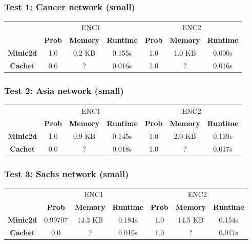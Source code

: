 \subsubsection{Test 1: Cancer network (small)}
\begin{table}[H]
    \centering
    \begin{tabular}{c|c|c|c|c|c|c|}
    \cline{2-7}
            & \multicolumn{3}{c|}{ENC1} & \multicolumn{3}{c|}{ENC2} \\ \cline{2-7}
      & \textbf{Prob}  & \textbf{Memory}  & \textbf{Runtime} & \textbf{Prob}  & \textbf{Memory}  & \textbf{Runtime} \\ \cline{1-7}
      \textbf{Minic2d} & 1.0  & 0.2 KB    & 0.155s   & 1.0    & 1.0 KB    & 0.000s \\
      \hline
    \textbf{Cachet}  & 0.0  & ?    & 0.016s       & 1.0     & ?    & 0.016s    \\ \cline{1-7}
    \end{tabular}
\end{table}

\subsubsection{Test 2: Asia network (small)}
\begin{table}[H]
    \centering
    \begin{tabular}{c|c|c|c|c|c|c|}
    \cline{2-7}
            & \multicolumn{3}{c|}{ENC1} & \multicolumn{3}{c|}{ENC2} \\ \cline{2-7}
      & \textbf{Prob}  & \textbf{Memory}  & \textbf{Runtime} & \textbf{Prob}  & \textbf{Memory}  & \textbf{Runtime} \\ \cline{1-7}
      \textbf{Minic2d} & 1.0  & 0.9 KB    & 0.145s   & 1.0    & 2.0 KB    & 	 0.139s \\
      \hline
    \textbf{Cachet}  & 0.0  & ?    & 0.018s       & 1.0     & ?    & 0.017s    \\ \cline{1-7}
    \end{tabular}
\end{table}

\subsubsection{Test 3: Sachs network (small)}
\begin{table}[H]
    \centering
    \begin{tabular}{c|c|c|c|c|c|c|}
    \cline{2-7}
            & \multicolumn{3}{c|}{ENC1} & \multicolumn{3}{c|}{ENC2} \\ \cline{2-7}
      & \textbf{Prob}  & \textbf{Memory}  & \textbf{Runtime} & \textbf{Prob}  & \textbf{Memory}  & \textbf{Runtime} \\ \cline{1-7}
      \textbf{Minic2d} & 0.99707  & 14.3 KB    & 0.184s   & 1.0    & 14.5 KB   & 	0.154s \\
      \hline
    \textbf{Cachet}  & 0.0  & ?    & 0.019s       & 1.0     & ?    & 0.017s    \\ \cline{1-7}
    \end{tabular}
\end{table}

